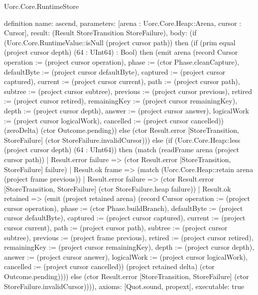 \begin{lexlean}{Uorc.Core.RuntimeStore}
\begin{semanticmodule}
definition{
  name: ascend,
  parameters: [arena : Uorc.Core.Heap::Arena, cursor : Cursor],
  result: (Result StoreTransition StoreFailure),
  body: (if (Uorc.Core.RuntimeValue::isNull (project cursor path)) then (if (prim equal (project cursor depth) (64 : UInt64) : Bool) then (emit arena (record Cursor {operation := (project cursor operation), phase := (ctor Phase.cleanCapture), defaultByte := (project cursor defaultByte), captured := (project cursor captured), current := (project cursor current), path := (project cursor path), subtree := (project cursor subtree), previous := (project cursor previous), retired := (project cursor retired), remainingKey := (project cursor remainingKey), depth := (project cursor depth), answer := (project cursor answer), logicalWork := (project cursor logicalWork), cancelled := (project cursor cancelled)}) (zeroDelta) (ctor Outcome.pending)) else (ctor Result.error [StoreTransition, StoreFailure] (ctor StoreFailure.invalidCursor))) else (if (Uorc.Core.Heap::less (project cursor depth) (64 : UInt64)) then (match (readFrame arena (project cursor path))
    | Result.error failure => (ctor Result.error [StoreTransition, StoreFailure] failure)
    | Result.ok frame => (match (Uorc.Core.Heap::retain arena (project frame previous))
      | Result.error failure => (ctor Result.error [StoreTransition, StoreFailure] (ctor StoreFailure.heap failure))
      | Result.ok retained => (emit (project retained arena) (record Cursor {operation := (project cursor operation), phase := (ctor Phase.buildBranch), defaultByte := (project cursor defaultByte), captured := (project cursor captured), current := (project cursor current), path := (project cursor path), subtree := (project cursor subtree), previous := (project frame previous), retired := (project cursor retired), remainingKey := (project cursor remainingKey), depth := (project cursor depth), answer := (project cursor answer), logicalWork := (project cursor logicalWork), cancelled := (project cursor cancelled)}) (project retained delta) (ctor Outcome.pending)))) else (ctor Result.error [StoreTransition, StoreFailure] (ctor StoreFailure.invalidCursor)))),
  axioms: [Quot.sound, propext],
  executable: true
}


\end{semanticmodule}
\end{lexlean}
